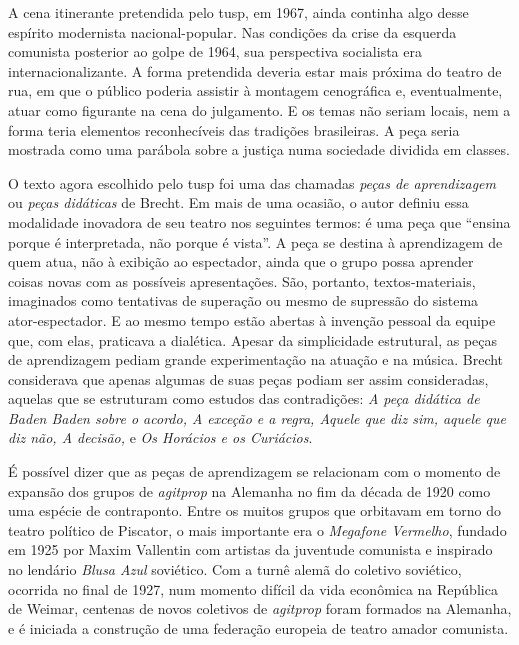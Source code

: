 
A cena itinerante pretendida pelo {\sc tusp}, em 1967, ainda continha algo
desse espírito modernista nacional-popular. Nas condições da crise da
esquerda comunista posterior ao golpe de 1964, sua perspectiva
socialista era internacionalizante. A forma pretendida deveria estar
mais próxima do teatro de rua, em que o público poderia assistir à
montagem cenográfica e, eventualmente, atuar como figurante na cena do
julgamento. E os temas não seriam locais, nem a forma teria elementos
reconhecíveis das tradições brasileiras. A peça seria mostrada como uma
parábola sobre a justiça numa sociedade dividida em classes.

\subject{Estudo de formas cênico-dramatúrgicas: aprendizagem e agitprop}

O texto agora escolhido pelo {\sc tusp} foi uma das chamadas {\it peças de
aprendizagem} ou {\it peças didáticas} de Brecht. Em mais de uma
ocasião, o autor definiu essa modalidade inovadora de seu teatro nos
seguintes termos: é uma peça que “ensina porque é interpretada, não
porque é vista”. A peça se destina à aprendizagem de quem atua, não à
exibição ao espectador, ainda que o grupo possa aprender coisas novas
com as possíveis apresentações. São, portanto, textos-materiais,
imaginados como tentativas de superação ou mesmo de supressão do sistema
ator-espectador. E ao mesmo tempo estão abertas à invenção pessoal da
equipe que, com elas, praticava a dialética. Apesar da
simplicidade estrutural, as peças de aprendizagem pediam grande
experimentação na atuação e na música. Brecht considerava que apenas
algumas de suas peças podiam ser assim consideradas, aquelas que se
estruturam como estudos das contradições: {\it A peça didática de Baden
Baden sobre o acordo, A exceção e a regra, Aquele que diz sim, aquele
que diz não, A decisão,} e {\it Os Horácios e os Curiácios}.

É possível dizer que as peças de aprendizagem se relacionam com o
momento de expansão dos grupos de {\it agitprop} na Alemanha no fim da
década de 1920 como uma espécie de contraponto. Entre os muitos grupos
que orbitavam em torno do teatro político de Piscator, o
mais importante era o {\it Megafone Vermelho}, fundado em 1925 por
Maxim Vallentin com artistas da juventude comunista e inspirado no
lendário {\it Blusa Azul} soviético. Com a turnê alemã do coletivo
soviético, ocorrida no final de 1927, num momento difícil da vida
econômica na República de Weimar, centenas de novos coletivos de
{\it agitprop} foram formados na Alemanha, e é iniciada a construção de
uma federação europeia de teatro amador comunista.

